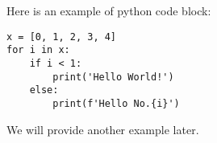 \documentclass[a4paper,10pt]{article}
\begin{document}
Here is an example of python code block:
\begin{verbatim}
x = [0, 1, 2, 3, 4]
for i in x:
    if i < 1:
        print('Hello World!')
    else:
        print(f'Hello No.{i}')
\end{verbatim}

We will provide another example later.
\end{document}
